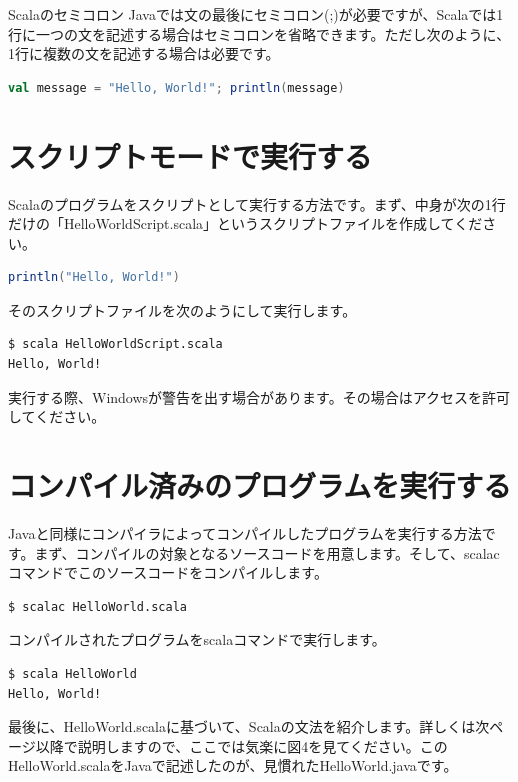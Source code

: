 \documentclass[10pt]{jarticle}
\begin{document}
\begin{itembox}[l]{Scalaのセミコロン}
Javaでは文の最後にセミコロン(;)が必要ですが、Scalaでは1行に一つの文を記述する場合はセミコロンを省略できます。ただし次のように、1行に複数の文を記述する場合は必要です。
\begin{lstlisting}[language=scala, frame=none]
val message = "Hello, World!"; println(message)
\end{lstlisting}
\end{itembox}

\section{スクリプトモードで実行する}
Scalaのプログラムをスクリプトとして実行する方法です。まず、中身が次の1行だけの「HelloWorldScript.scala」というスクリプトファイルを作成してください。
\begin{lstlisting}[language=scala, frame=none]
println("Hello, World!")
\end{lstlisting}
そのスクリプトファイルを次のようにして実行します。
\begin{lstlisting}[language=bash, frame=none]
$ scala HelloWorldScript.scala
Hello, World!
\end{lstlisting}
実行する際、Windowsが警告を出す場合があります。その場合はアクセスを許可してください。 

\section{コンパイル済みのプログラムを実行する}
Javaと同様にコンパイラによってコンパイルしたプログラムを実行する方法です。まず、コンパイルの対象となるソースコードを用意します。そして、scalacコマンドでこのソースコードをコンパイルします。
\begin{lstlisting}[language=bash, frame=none]
$ scalac HelloWorld.scala
\end{lstlisting}
コンパイルされたプログラムをscalaコマンドで実行します。
\begin{lstlisting}[language=bash, frame=none]
$ scala HelloWorld
Hello, World!
\end{lstlisting}
最後に、HelloWorld.scalaに基づいて、Scalaの文法を紹介します。詳しくは次ページ以降で説明しますので、ここでは気楽に図4を見てください。このHelloWorld.scalaをJavaで記述したのが、見慣れたHelloWorld.javaです。
\end{document}
